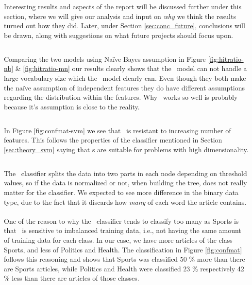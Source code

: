 Interesting results and aspects of the report will be discussed further under this section, where we will give our analysis and input on \emph{why} we think the results turned out how they did. Later, under Section \ref{sec:conc_future}, conclusions will be drawn, along with suggestions on what future projects should focus upon.
\subsection{\nb} %
\label{sub:nb}
Comparing the two models using Naïve Bayes assumption in Figure \ref{fig:hitratio-nb} \& \ref{fig:hitratio-mn} our results clearly shows that the \bn\ model can not handle a large vocabulary size which the \mn\ model clearly can. Even though they both make the naïve assumption of independent features they do have different assumptions regarding the distribution within the features. Why \mn\ works so well is probably because it's assumption is close to the reality.

\subsection{\svm}
In Figure \ref{fig:confmat-svm} we see that \svm\ is resistant to increasing number of features. This follows the properties of the classifier mentioned in Section \ref{sec:theory_svm} saying that \svm s are suitable for problems with high dimensionality.

\subsection{\rf}
The \rf\ classifier splits the data into two parts in each node depending on threshold values, so if the data is normalized or not, when building the tree, does not really matter for the classifier. We expected to see more difference in the binary data type, due to the fact that it discards how \emph{many} of each word the article contains.
\\\\
One of the reason to why the \rf\ classifier tends to classify too many as Sports is that \rf\ is sensitive to imbalanced training data, i.e., not having the same amount of training data for each class. In our case, we have more articles of the class Sports, and less of Politics and Health. The classification in Figure \ref{fig:confmat} follows this reasoning and shows that Sports was classified 50 \% more than there are Sports articles, while Politics and Health were classified 23 \% respectively 42 \% less than there are articles of those classes.

